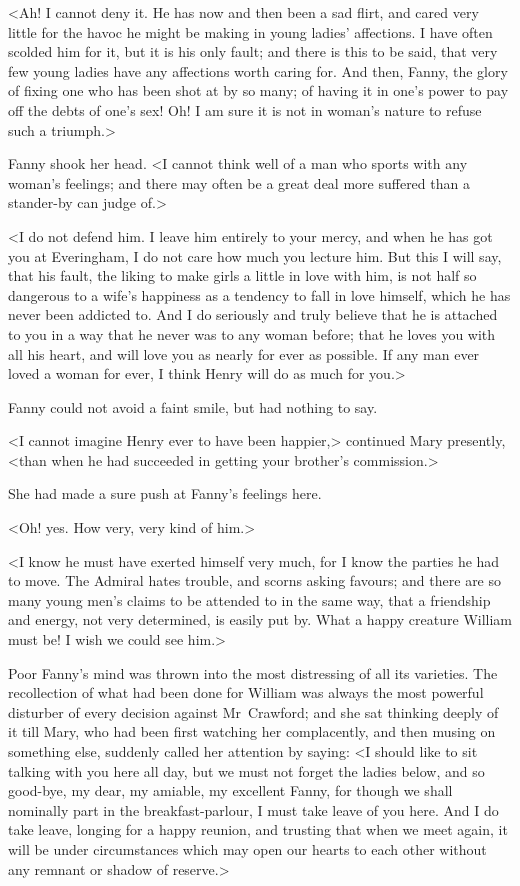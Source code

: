 <Ah! I cannot deny it. He has now and then been a sad flirt, and cared very little for the havoc he might be making in young ladies' affections. I have often scolded him for it, but it is his only fault; and there is this to be said, that very few young ladies have any affections worth caring for. And then, Fanny, the glory of fixing one who has been shot at by so many; of having it in one's power to pay off the debts of one's sex! Oh! I am sure it is not in woman's nature to refuse such a triumph.>

Fanny shook her head. <I cannot think well of a man who sports with any woman's feelings; and there may often be a great deal more suffered than a stander-by can judge of.>

<I do not defend him. I leave him entirely to your mercy, and when he has got you at Everingham, I do not care how much you lecture him. But this I will say, that his fault, the liking to make girls a little in love with him, is not half so dangerous to a wife's happiness as a tendency to fall in love himself, which he has never been addicted to. And I do seriously and truly believe that he is attached to you in a way that he never was to any woman before; that he loves you with all his heart, and will love you as nearly for ever as possible. If any man ever loved a woman for ever, I think Henry will do as much for you.>

Fanny could not avoid a faint smile, but had nothing to say.

<I cannot imagine Henry ever to have been happier,> continued Mary presently, <than when he had succeeded in getting your brother's commission.>

She had made a sure push at Fanny's feelings here.

<Oh! yes. How very, very kind of him.>

<I know he must have exerted himself very much, for I know the parties he had to move. The Admiral hates trouble, and scorns asking favours; and there are so many young men's claims to be attended to in the same way, that a friendship and energy, not very determined, is easily put by. What a happy creature William must be! I wish we could see him.>

Poor Fanny's mind was thrown into the most distressing of all its varieties. The recollection of what had been done for William was always the most powerful disturber of every decision against Mr~Crawford; and she sat thinking deeply of it till Mary, who had been first watching her complacently, and then musing on something else, suddenly called her attention by saying: <I should like to sit talking with you here all day, but we must not forget the ladies below, and so good-bye, my dear, my amiable, my excellent Fanny, for though we shall nominally part in the breakfast-parlour, I must take leave of you here. And I do take leave, longing for a happy reunion, and trusting that when we meet again, it will be under circumstances which may open our hearts to each other without any remnant or shadow of reserve.>

